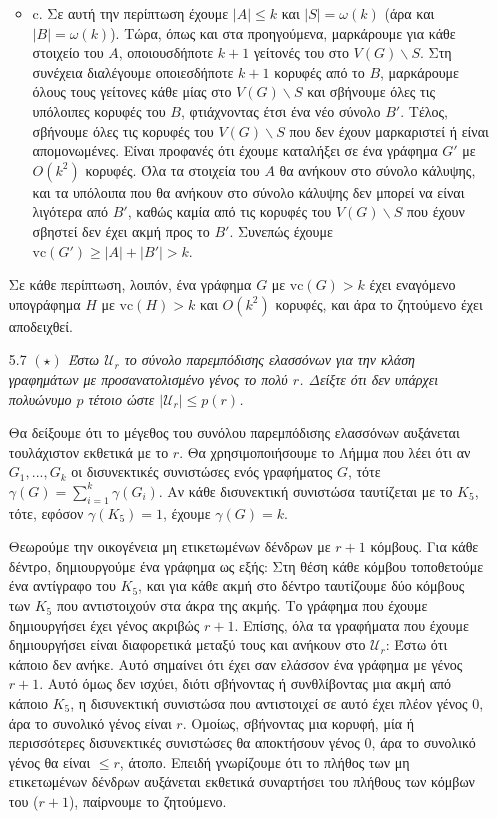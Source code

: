 \documentclass[a4paper, oneside, 11pt]{article}
\theoremstyle{definition}
\newcommand{\vc}{\text{vc}}
\begin{document}
\begin{enumerate}
\begin{itemize}
\item{c.}
Σε αυτή την περίπτωση έχουμε $|A|\leq k$ και $|S|=\omega(k)$ (άρα και $|B|=\omega(k)$). Τώρα, όπως και στα προηγούμενα, μαρκάρουμε για κάθε στοιχείο του $A$, οποιουσδήποτε $k+1$ γείτονές του στο
$V(G)\backslash S$. Στη συνέχεια διαλέγουμε οποιεσδήποτε $k+1$ κορυφές από το $B$, μαρκάρουμε όλους τους γείτονες κάθε μίας στο $V(G)\backslash S$ και σβήνουμε όλες τις υπόλοιπες κορυφές του $B$,
φτιάχνοντας έτσι ένα νέο σύνολο $B'$.
Τέλος, σβήνουμε όλες τις κορυφές του $V(G)\backslash S$ που δεν έχουν μαρκαριστεί ή είναι απομονωμένες. Είναι προφανές ότι έχουμε καταλήξει σε ένα γράφημα $G'$
με $O(k^2)$ κορυφές. Όλα τα στοιχεία του $A$ θα ανήκουν
στο σύνολο κάλυψης, και τα υπόλοιπα που θα ανήκουν στο σύνολο κάλυψης δεν μπορεί να είναι λιγότερα από $B'$, καθώς καμία από τις κορυφές του $V(G)\backslash S$ που έχουν σβηστεί δεν έχει ακμή
προς το $B'$. Συνεπώς έχουμε $\vc(G')\geq |A| + |B'| > k$.

\end{itemize}
Σε κάθε περίπτωση, λοιπόν, ένα γράφημα $G$ με $\vc(G)>k$ έχει εναγόμενο υπογράφημα $H$ με $\vc(H)>k$ και $O(k^2)$ κορυφές, και άρα το ζητούμενο έχει αποδειχθεί.


	\item[5.7] \emph{$(\star)$ Έστω $\mathcal{U}_r$ το σύνολο παρεμπόδισης ελασσόνων για την κλάση γραφημάτων με προσανατολισμένο γένος το πολύ $r$. Δείξτε ότι δεν υπάρχει πολυώνυμο $p$ τέτοιο ώστε
$|\mathcal{U}_r|\leq p(r)$.}

Θα δείξουμε ότι το μέγεθος του συνόλου παρεμπόδισης ελασσόνων αυξάνεται τουλάχιστον εκθετικά με το $r$. Θα χρησιμοποιήσουμε το Λήμμα που λέει ότι αν $G_1, ..., G_k$ οι δισυνεκτικές συνιστώσες
ενός γραφήματος $G$, τότε $\gamma (G) = \sum_{i=1}^k \gamma(G_i)$. Αν κάθε δισυνεκτική συνιστώσα ταυτίζεται με το $K_5$, τότε, εφόσον $\gamma (K_5)=1$, έχουμε $\gamma (G) = k$.

Θεωρούμε την οικογένεια μη ετικετωμένων δένδρων με $r+1$ κόμβους. Για κάθε δέντρο, δημιουργούμε ένα γράφημα ως εξής: 
Στη θέση κάθε κόμβου τοποθετούμε ένα αντίγραφο του $K_5$, και για κάθε ακμή στο δέντρο ταυτίζουμε δύο κόμβους των $K_5$ που αντιστοιχούν
στα άκρα της ακμής. Το γράφημα που έχουμε δημιουργήσει έχει γένος ακριβώς $r+1$. Επίσης, όλα τα γραφήματα που έχουμε δημιουργήσει είναι διαφορετικά μεταξύ τους και ανήκουν στο $\mathcal{U}_r$:
Έστω ότι κάποιο δεν ανήκε. Αυτό σημαίνει ότι έχει σαν ελάσσον ένα γράφημα με γένος $r+1$. Αυτό όμως δεν ισχύει, διότι σβήνοντας ή συνθλίβοντας μια ακμή από κάποιο 
$K_5$, η δισυνεκτική συνιστώσα που αντιστοιχεί
σε αυτό έχει πλέον γένος $0$, άρα το συνολικό γένος είναι $r$. Ομοίως, σβήνοντας μια κορυφή, μία ή περισσότερες δισυνεκτικές συνιστώσες θα αποκτήσουν γένος $0$, άρα το συνολικό γένος θα είναι $\leq r$,
άτοπο. 
\newline
Επειδή γνωρίζουμε ότι το πλήθος των μη ετικετωμένων δένδρων αυξάνεται εκθετικά συναρτήσει του πλήθους των κόμβων του ($r+1$), παίρνουμε το ζητούμενο.

\end{enumerate}
\end{document}
